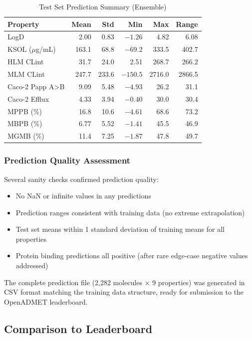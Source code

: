 \documentclass[11pt,a4paper]{article}
\begin{document}
\begin{table}[h]
\centering
\caption{Test Set Prediction Summary (Ensemble)}
\label{tab:test_predictions}
\small
\begin{tabular}{lrrrrr}
\toprule
Property & Mean & Std & Min & Max & Range \\
\midrule
LogD & 2.00 & 0.83 & $-1.26$ & 4.82 & 6.08 \\
KSOL ($\mu$g/mL) & 163.1 & 68.8 & $-69.2$ & 333.5 & 402.7 \\
HLM CLint & 31.7 & 24.0 & 2.51 & 268.7 & 266.2 \\
MLM CLint & 247.7 & 233.6 & $-150.5$ & 2716.0 & 2866.5 \\
Caco-2 Papp A>B & 9.09 & 5.48 & $-4.93$ & 26.2 & 31.1 \\
Caco-2 Efflux & 4.33 & 3.94 & $-0.40$ & 30.0 & 30.4 \\
MPPB (\%) & 16.8 & 10.6 & $-4.61$ & 68.6 & 73.2 \\
MBPB (\%) & 6.77 & 5.52 & $-1.41$ & 45.5 & 46.9 \\
MGMB (\%) & 11.4 & 7.25 & $-1.87$ & 47.8 & 49.7 \\
\bottomrule
\end{tabular}
\end{table}

\subsubsection{Prediction Quality Assessment}

Several sanity checks confirmed prediction quality:
\begin{itemize}
    \item No NaN or infinite values in any predictions
    \item Prediction ranges consistent with training data (no extreme extrapolation)
    \item Test set means within 1 standard deviation of training means for all properties
    \item Protein binding predictions all positive (after rare edge-case negative values addressed)
\end{itemize}

The complete prediction file (2,282 molecules $\times$ 9 properties) was generated in CSV format matching the training data structure, ready for submission to the OpenADMET leaderboard.

\subsection{Comparison to Leaderboard}
\end{document}
